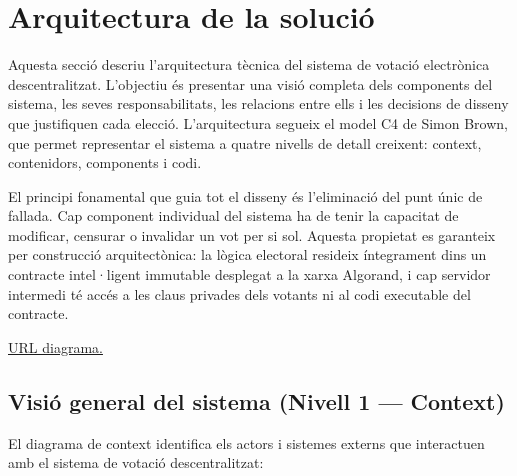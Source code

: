 \section{Arquitectura de la solució}
 
Aquesta secció descriu l'arquitectura tècnica del sistema de votació electrònica descentralitzat. L'objectiu és presentar una visió completa dels components del sistema, les seves responsabilitats, les relacions entre ells i les decisions de disseny que justifiquen cada elecció. L'arquitectura segueix el model C4 de Simon Brown, que permet representar el sistema a quatre nivells de detall creixent: context, contenidors, components i codi.
 
El principi fonamental que guia tot el disseny és l'eliminació del punt únic de fallada. Cap component individual del sistema ha de tenir la capacitat de modificar, censurar o invalidar un vot per si sol. Aquesta propietat es garanteix per construcció arquitectònica: la lògica electoral resideix íntegrament dins un contracte intel·ligent immutable desplegat a la xarxa Algorand, i cap servidor intermedi té accés a les claus privades dels votants ni al codi executable del contracte.

\href{https://drive.google.com/file/d/19bZjOcyCW3vcCqPl0YcqOhWvxd-m8CH3/view?usp=sharing}{URL diagrama.}
 
\subsection{Visió general del sistema (Nivell 1 --- Context)}
 
El diagrama de context identifica els actors i sistemes externs que interactuen amb el sistema de votació descentralitzat:
 
